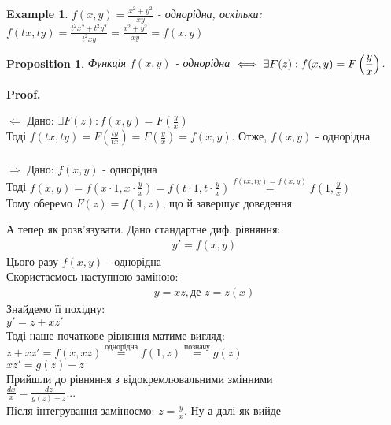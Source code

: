 \documentclass[a4paper, 10pt]{article}
\makeatletter
\def\qed{$\blacksquare$}
\def\rightproof{$\boxed{\Rightarrow}$ }
\def\leftproof{$\boxed{\Leftarrow}$ }
\theoremstyle{theoremdd}
\theoremstyle{theoremdd}
\theoremstyle{theoremdd}
\theoremstyle{theoremdd}
\newtheorem{example}[theorem]{Example}
\theoremstyle{theoremdd}
\newtheorem{proposition}[theorem]{Proposition}
\theoremstyle{theoremdd}
\theoremstyle{theoremdd}
\theoremstyle{theoremdd}
\renewenvironment{proof}[1][Proof.\\]{\par
\pushQED{\hfill \qed}%
\normalfont \topsep6\p@\@plus6\p@\relax
\trivlist
\item\relax
{\bfseries
#1\@addpunct{.}}\hspace\labelsep\ignorespaces
}{%
\popQED\endtrivlist\@endpefalse
}
\makeatother
\begin{document}
	\begin{example}
 $\displaystyle f(x,y) = \frac{x^2+y^2}{xy}$ - однорідна, оскільки:\\
	$\displaystyle f(tx, ty) = \frac{t^2x^2+t^2y^2}{t^2xy} = \frac{x^2+y^2}{xy} = f(x,y)$
	\end{example}
	
	\begin{proposition}
 Функція $f(x,y)$ - однорідна $\iff \displaystyle \exists F(z): \\f(x,y)=F\left(\frac{y}{x}\right)$.
	\end{proposition}

	\begin{proof}
	\leftproof Дано: $\displaystyle \exists F(z): f(x,y)=F\left(\frac{y}{x}\right)$\\
	Тоді $\displaystyle f(tx,ty) = F\left(\frac{ty}{tx} \right) = F\left(\frac{y}{x} \right) = f(x,y)$. Отже, $f(x,y)$ - однорідна\\
	\\
	\rightproof Дано: $f(x,y)$ - однорідна\\
	Тоді $\displaystyle f(x,y) = f\left(x\cdot1, x \cdot \frac{y}{x} \right) = f\left(t\cdot1, t \cdot \frac{y}{x} \right) \overset{f(tx,ty)=f(x,y)}{=} f\left(1, \frac{y}{x}\right)$\\
	Тому оберемо $F(z) = f(1,z)$, що й завершує доведення 
	\end{proof}
	
	А тепер як розв'язувати. Дано стандартне диф. рівняння:
	\begin{align*}
	y'=f(x,y)
	\end{align*}
	Цього разу $f(x,y)$ - однорідна\\
	Скористаємось наступною заміною:
	\begin{align*}
	y=xz, \textrm{де } z=z(x)
	\end{align*}
	Знайдемо її похідну:\\
	$y' = z + xz'$\\
	Тоді наше початкове рівняння матиме вигляд:\\
	$\displaystyle z+xz'=f(x, xz) \overset{\textrm{однорідна}}{=} f(1,z) \overset{\textrm{позначу}}{=}g(z)$\\
	$xz'=g(z)-z$\\
	Прийшли до рівняння з відокремлювальними змінними\\
	$\displaystyle \frac{dx}{x} = \frac{dz}{g(z)-z} ...$\\
	Після інтегрування замінюємо: $\displaystyle z = \frac{y}{x}$. Ну а далі як вийде
	
\end{document}
